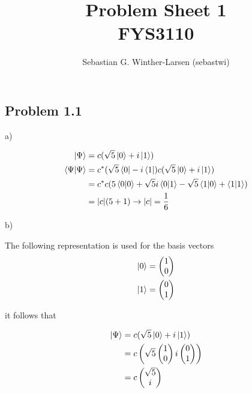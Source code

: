 \documentclass{article}
\title{Problem Sheet 1 \\
\large{FYS3110}}
\author{Sebastian G. Winther-Larsen (sebastwi)}
\begin{document}
\maketitle

\subsection*{Problem 1.1}

\hspace{1cm}

a)

\begin{align*}
\ket{\Psi} 		&= c(\sqrt{5}\ket{0}+i\ket{1})\\
\braket{\Psi} 	&= c^*(\sqrt{5}\bra{0}-i\bra{1}) c(\sqrt{5}\ket{0}+i\ket{1})\\
				&= c^*c(5\braket{0}+\sqrt{5}i\braket{0}{1}-\sqrt{5}\braket{1}{0}+\braket{1})\\
				&= \abs{c}(5+1) \rightarrow \abs{c}=\frac{1}{6}
\end{align*}

\hspace{1cm}

b)

\hspace{1cm}

The following representation is used for the basis vectors
\begin{align*}
\ket{0} &= \begin{pmatrix} 1 \\ 0 \end{pmatrix}\\
\ket{1} &= \begin{pmatrix} 0 \\ 1 \end{pmatrix}
\end{align*}

it follows that

\begin{align*}
\ket{\Psi} 	&= c(\sqrt{5}\ket{0}+i\ket{1}) \\
			&= c\left(
				\sqrt{5} \begin{pmatrix} 1 \\ 0 \end{pmatrix}
				i \begin{pmatrix} 0 \\ 1 \end{pmatrix}
				\right) \\
			&= c \begin{pmatrix} \sqrt{5} \\ i \end{pmatrix} \\[10pt]
\end{align*}
\end{document}

